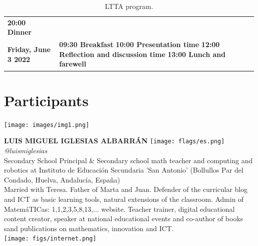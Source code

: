 \documentclass[11pt]{article}
\begin{document}
\begin{table}
\begin{center}
\begin{tabular}{m{6cm} m{8cm}}
        \textbf{20:00 Dinner} \\
        \rowcolor{gray!15}
        \centering\textbf{Friday, June 3 2022} &
        \textbf{09:30 Breakfast} \newline 
        \textbf{10:00 Presentation time} \newline 
        \textbf{12:00 Reflection and discussion time} \newline 
        \textbf{13:00 Lunch and farewell} \\
        \bottomrule%
    \end{tabular}
      \caption[LTTA program]{LTTA program.}
      \label{tab:program}
     \end{center}
    \end{table}

    \newpage

\section*{Participants}
\noindent
\begin{minipage}{0.3\textwidth}
\centering
\texttt{[image: images/img1.png]}
\end{minipage}
\hfill
\begin{minipage}{0.6\textwidth}\raggedright
\color{color1}\uppercase{\textbf{Luis Miguel Iglesias Albarrán}}
\color{color2}\hspace{0.2cm}\texttt{[image: flags/es.png]}
\hspace{0.2cm}\textit{@luismiglesias}
\\
Secondary School Principal \& Secondary school math teacher and computing and robotics at Instituto de Educación Secundaria 'San Antonio' (Bollullos Par del Condado, Huelva, Andalucía, España)\\
{\footnotesize Married with Teresa. Father of Marta and Juan. Defender of the curricular blog and ICT as basic learning tools, natural extensions of the classroom. Admin of MatemáTICas: 1,1,2,3,5,8,13,... website. Teacher trainer, digital educational content creator, speaker at national educational events and co-author of books sand publications on mathematics, innovation and ICT.}\\
\texttt{[image: figs/internet.png]}
\end{minipage}
\newline\newline\newline
\end{document}
